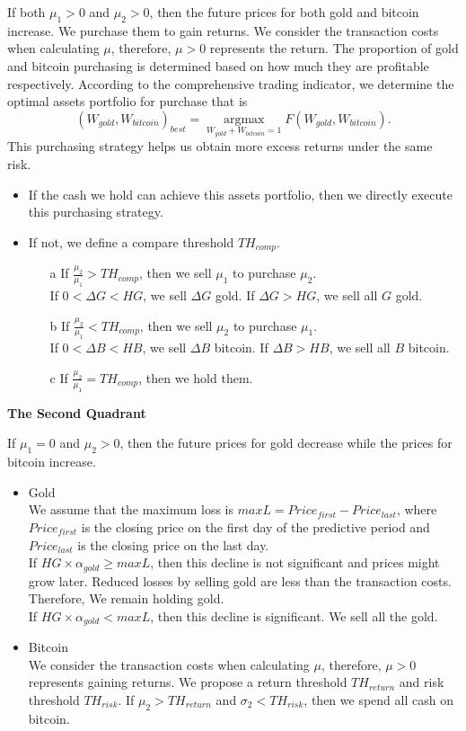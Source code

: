 \documentclass[12pt]{article}
\begin{document}
If both $\mu_1>0$ and $\mu_2>0$, then the future prices for both gold and bitcoin increase. We purchase them to gain returns. We consider the transaction costs when calculating $\mu$, therefore, $\mu>0$ represents the return. The proportion of gold and bitcoin purchasing is determined based on how much they are profitable respectively. According to the comprehensive trading indicator, we determine the optimal assets portfolio for purchase that is
\begin{equation*}
{(W_{gold}, W_{bitcoin})}_{best}=\mathop{\arg\max}\limits_{W_{gold}+W_{bitcoin}=1}F(W_{gold}, W_{bitcoin}).
\end{equation*}
This purchasing strategy helps us obtain more excess returns under the same risk.
\begin{itemize}
\item If the cash we hold can achieve this assets portfolio, then we directly execute this purchasing strategy.
\item If not, we define a compare threshold $TH_{comp}$.
 \begin{itemize}
 \item[a] If $\frac{\mu_2}{\mu_1}>TH_{comp}$, then we sell $\mu_1$ to purchase $\mu_2$.\\
If $0<\Delta G<HG$, we sell $\Delta G$ gold. If $\Delta G>HG$, we sell all $G$ gold.  
 \item[b] If $\frac{\mu_2}{\mu_1}<TH_{comp}$, then we sell $\mu_2$ to purchase $\mu_1$.\\ 
If $0<\Delta B<HB$, we sell $\Delta B$ bitcoin. If $\Delta B>HB$, we sell all $B$ bitcoin.  
 \item[c] If $\frac{\mu_2}{\mu_1}=TH_{comp}$, then we hold them.
 \end{itemize}
\end{itemize}

\noindent
\textbf{The Second Quadrant}

If $\mu_1=0$ and $\mu_2>0$, then the future prices for gold decrease while the prices for bitcoin increase.
\begin{itemize}
\item Gold\\
We assume that the maximum loss is $maxL=Price_{first}-Price_{last}$, where $Price_{first}$ is the closing price on the first day of the predictive period and $Price_{last}$ is the closing price on the last day.\\
If $HG\times \alpha_{gold}\geq maxL$, then this decline is not significant and prices might grow later. Reduced losses by selling gold are less than the transaction costs. Therefore, We remain holding gold.\\
If $HG\times \alpha_{gold}<maxL$, then this decline is significant. We sell all the gold.
\item Bitcoin\\
We consider the transaction costs when calculating $\mu$, therefore, $\mu>0$ represents gaining returns. We propose a return threshold $TH_{return}$ and risk threshold $TH_{risk}$. If $\mu_2>TH_{return}$ and $\sigma_2<TH_{risk}$, then we spend all cash on bitcoin.
\end{itemize}
\end{document}
